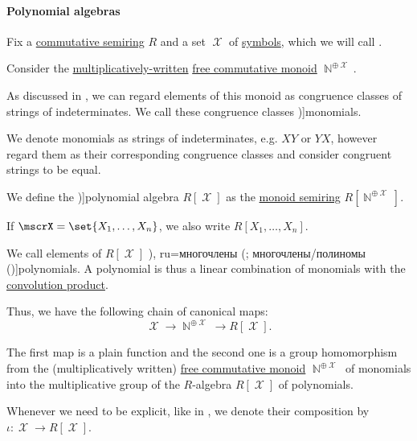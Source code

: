 \paragraph{Polynomial algebras}

\begin{definition}\label{def:polynomial_algebra}\mimprovised
  Fix a \hyperref[def:semiring/commutative]{commutative semiring} \( R \) and a set \( \mscrX \) of \hyperref[def:formal_language/symbol]{symbols}, which we will call .

  \begin{thmenum}
     Consider the \hyperref[def:free_commutative_monoid]{multiplicatively-written} \hyperref[def:free_commutative_monoid]{free commutative monoid} \( \BbbN^{\oplus \mscrX} \).

    As discussed in , we can regard elements of this monoid as congruence classes of strings of indeterminates. We call these congruence classes \term[ru=одночлен/моном (\cite[sec. 11.3]{Тыртышников2007})]{monomials}.

    We denote monomials as strings of indeterminates, e.g. \( XY \) or \( YX \), however regard them as their corresponding congruence classes and consider congruent strings to be equal.

     We define the \term[ru=алгебра многочленов (\cite[92]{Винберг2014})]{polynomial algebra} \( R[\mscrX] \) as the \hyperref[def:semigroup_algebra]{monoid semiring} \( R[\BbbN^{\oplus \mscrX}] \).

    If \( \mscrX = \set{ X_1, \ldots, X_n } \), we also write \( R[X_1, \ldots, X_n] \).

    We call elements of \( R[\mscrX] \) \term[bg=полиноми (\cite[22]{ГеновМиховскиМоллов1991}), ru=многочлены (\cite[92]{Винберг2014}; многочлены/полиномы (\cite[sec. 11.3]{Тыртышников2007})]{polynomials}. A polynomial is thus a linear combination of monomials with the \hyperref[def:semigroup_algebra]{convolution product}.

     Thus, we have the following chain of canonical maps:
    \begin{equation*}
      \mscrX \to \BbbN^{\oplus \mscrX} \to R[\mscrX].
    \end{equation*}

    The first map is a plain function and the second one is a group homomorphism from the (multiplicatively written) \hyperref[def:free_commutative_monoid]{free commutative monoid} \( \BbbN^{\oplus \mscrX} \) of monomials into the multiplicative group of the \( R \)-algebra \( R[\mscrX] \) of polynomials.

    Whenever we need to be explicit, like in , we denote their composition by \( \iota: \mscrX \to R[\mscrX] \).
  \end{thmenum}
\end{definition}

